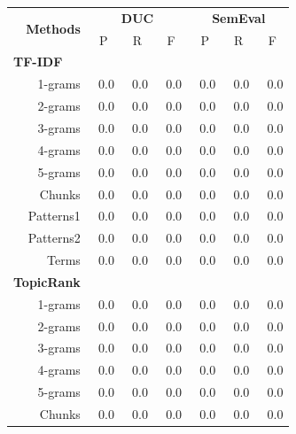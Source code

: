     \begin{table}[h]
      \centering
      \begin{tabular}{@{~}r@{~~}c@{~~}c@{~~}c@{~~}c@{~~}c@{~~}c@{~}}
        \toprule
        \multirow{2}{*}[-2pt]{\textbf{Methods}} & \multicolumn{3}{c}{\textbf{DUC}} & \multicolumn{3}{c}{\textbf{SemEval}}\\
        \cmidrule(r){2-4}\cmidrule{5-7}
        & P & R & F & P & R & F\\
        \midrule
        \multicolumn{1}{l}{\textbf{TF-IDF}}\\
        1-grams & ${~~}$0.0 & ${~~}$0.0 & ${~~}$0.0 & ${~~}$0.0 & ${~~}$0.0 & ${~~}$0.0\\
        2-grams & ${~~}$0.0 & ${~~}$0.0 & ${~~}$0.0 & ${~~}$0.0 & ${~~}$0.0 & ${~~}$0.0\\
        3-grams & ${~~}$0.0 & ${~~}$0.0 & ${~~}$0.0 & ${~~}$0.0 & ${~~}$0.0 & ${~~}$0.0\\
        4-grams & ${~~}$0.0 & ${~~}$0.0 & ${~~}$0.0 & ${~~}$0.0 & ${~~}$0.0 & ${~~}$0.0\\
        5-grams & ${~~}$0.0 & ${~~}$0.0 & ${~~}$0.0 & ${~~}$0.0 & ${~~}$0.0 & ${~~}$0.0\\
        Chunks & ${~~}$0.0 & ${~~}$0.0 & ${~~}$0.0 & ${~~}$0.0 & ${~~}$0.0 & ${~~}$0.0\\
        Patterns1 & ${~~}$0.0 & ${~~}$0.0 & ${~~}$0.0 & ${~~}$0.0 & ${~~}$0.0 & ${~~}$0.0\\
        Patterns2 & ${~~}$0.0 & ${~~}$0.0 & ${~~}$0.0 & ${~~}$0.0 & ${~~}$0.0 & ${~~}$0.0\\
        Terms & ${~~}$0.0 & ${~~}$0.0 & ${~~}$0.0 & ${~~}$0.0 & ${~~}$0.0 & ${~~}$0.0\\
        \multicolumn{1}{l}{\textbf{TopicRank}}\\
        1-grams & ${~~}$0.0 & ${~~}$0.0 & ${~~}$0.0 & ${~~}$0.0 & ${~~}$0.0 & ${~~}$0.0\\
        2-grams & ${~~}$0.0 & ${~~}$0.0 & ${~~}$0.0 & ${~~}$0.0 & ${~~}$0.0 & ${~~}$0.0\\
        3-grams & ${~~}$0.0 & ${~~}$0.0 & ${~~}$0.0 & ${~~}$0.0 & ${~~}$0.0 & ${~~}$0.0\\
        4-grams & ${~~}$0.0 & ${~~}$0.0 & ${~~}$0.0 & ${~~}$0.0 & ${~~}$0.0 & ${~~}$0.0\\
        5-grams & ${~~}$0.0 & ${~~}$0.0 & ${~~}$0.0 & ${~~}$0.0 & ${~~}$0.0 & ${~~}$0.0\\
        Chunks & ${~~}$0.0 & ${~~}$0.0 & ${~~}$0.0 & ${~~}$0.0 & ${~~}$0.0 & ${~~}$0.0\\

\end{tabular}
\end{table}
